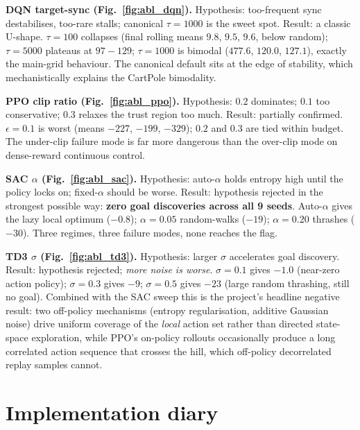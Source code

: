 \documentclass[10pt,a4paper]{article}
\begin{document}
\textbf{DQN target-sync (Fig.~\ref{fig:abl_dqn}).} Hypothesis: too-frequent sync destabilises, too-rare stalls; canonical $\tau{=}1000$ is the sweet spot. Result: a classic U-shape. $\tau{=}100$ collapses (final rolling means $9.8$, $9.5$, $9.6$, below random); $\tau{=}5000$ plateaus at $97{-}129$; $\tau{=}1000$ is bimodal ($477.6$, $120.0$, $127.1$), exactly the main-grid behaviour. The canonical default sits at the edge of stability, which mechanistically explains the CartPole bimodality.

\textbf{PPO clip ratio (Fig.~\ref{fig:abl_ppo}).} Hypothesis: $0.2$ dominates; $0.1$ too conservative; $0.3$ relaxes the trust region too much. Result: partially confirmed. $\epsilon{=}0.1$ is worst (means $-227$, $-199$, $-329$); $0.2$ and $0.3$ are tied within budget. The under-clip failure mode is far more dangerous than the over-clip mode on dense-reward continuous control.

\textbf{SAC $\alpha$ (Fig.~\ref{fig:abl_sac}).} Hypothesis: auto-$\alpha$ holds entropy high until the policy locks on; fixed-$\alpha$ should be worse. Result: hypothesis rejected in the strongest possible way: \textbf{zero goal discoveries across all 9 seeds}. Auto-$\alpha$ gives the lazy local optimum ($-0.8$); $\alpha{=}0.05$ random-walks ($-19$); $\alpha{=}0.20$ thrashes ($-30$). Three regimes, three failure modes, none reaches the flag.

\textbf{TD3 $\sigma$ (Fig.~\ref{fig:abl_td3}).} Hypothesis: larger $\sigma$ accelerates goal discovery. Result: hypothesis rejected; \emph{more noise is worse}. $\sigma{=}0.1$ gives $-1.0$ (near-zero action policy); $\sigma{=}0.3$ gives $-9$; $\sigma{=}0.5$ gives $-23$ (large random thrashing, still no goal). Combined with the SAC sweep this is the project's headline negative result: two off-policy mechanisms (entropy regularisation, additive Gaussian noise) drive uniform coverage of the \emph{local} action set rather than directed state-space exploration, while PPO's on-policy rollouts occasionally produce a long correlated action sequence that crosses the hill, which off-policy decorrelated replay samples cannot.


\section{Implementation diary}
\label{sec:diary}
\end{document}
